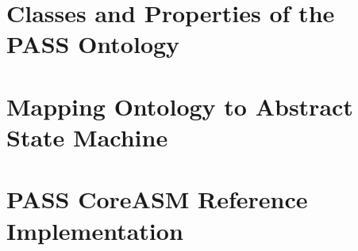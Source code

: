 \appendix

\chapter[Classes and Properties of the PASS Ontology]{Classes and Properties of the\\PASS Ontology}



\chapter{Mapping Ontology to Abstract State Machine}
\label{OntologyToASM}



\chapter{PASS CoreASM Reference Implementation}
\label{CoreASM-Reference-Implementation}


